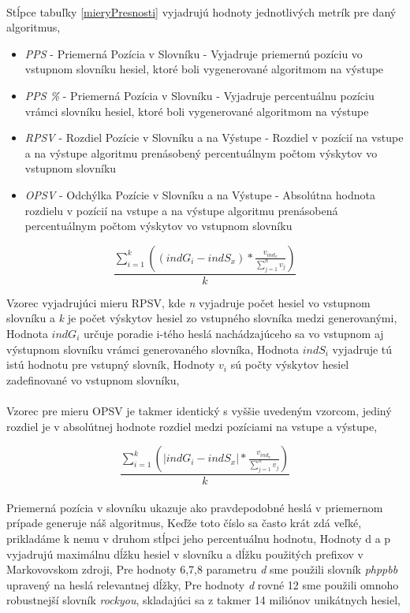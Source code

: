 \paragraph{}
Stĺpce tabuľky \ref{mieryPresnosti} vyjadrujú hodnoty jednotlivých metrík pre daný algoritmus,
\begin{itemize}
	\item \emph{PPS} - Priemerná Pozícia v Slovníku - Vyjadruje priemernú pozíciu vo vstupnom slovníku hesiel, ktoré boli vygenerované algoritmom na výstupe
	\item \emph{PPS \%} - Priemerná Pozícia v Slovníku - Vyjadruje percentuálnu pozíciu vrámci slovníku hesiel, ktoré boli vygenerované algoritmom na výstupe
	\item \emph{RPSV} - Rozdiel Pozície v Slovníku a na Výstupe - Rozdiel v pozícií na vstupe a na výstupe algoritmu prenásobený percentuálnym počtom výskytov vo vstupnom slovníku
    \item \emph{OPSV} - Odchýlka Pozície v Slovníku a na Výstupe - Absolútna hodnota rozdielu v pozícií na vstupe a na výstupe algoritmu prenásobená percentuálnym počtom výskytov vo vstupnom slovníku
\end{itemize}

\[ \frac{\displaystyle\sum_{i=1}^{k}((indG_i - indS_x) * \frac{v_{ind_x}}{\sum_{j=1}^{n}v_j})}{k} \]

Vzorec vyjadrujúci mieru RPSV, kde \emph{n} vyjadruje počet hesiel vo vstupnom slovníku a \emph{k} je počet výskytov hesiel zo vstupného slovníka medzi generovanými, Hodnota \emph{\(indG_i\)} určuje poradie i-tého heslá nachádzajúceho sa vo vstupnom aj výstupnom slovníku vrámci generovaného slovníka, Hodnota \emph{\(indS_i\)} vyjadruje tú istú hodnotu pre vstupný slovník, Hodnoty \emph{\(v_i\)} sú počty výskytov hesiel zadefinované vo vstupnom slovníku,

\paragraph{}
Vzorec pre mieru OPSV je takmer identický s vyššie uvedeným vzorcom, jediný rozdiel je v absolútnej hodnote rozdiel medzi pozíciami na vstupe a výstupe,

\[ \frac{\displaystyle\sum_{i=1}^{k}(|indG_i - indS_x| * \frac{v_{ind_x}}{\sum_{j=1}^{n}v_j})}{k} \]

\paragraph{}
Priemerná pozícia v slovníku ukazuje ako pravdepodobné heslá v priemernom prípade generuje náš algoritmus, Keďže toto číslo sa často krát zdá veľké, prikladáme k nemu v druhom stĺpci jeho percentuálnu hodnotu, Hodnoty d a p vyjadrujú maximálnu dĺžku hesiel v slovníku a dĺžku použitých prefixov v Markovovskom zdroji, Pre hodnoty 6,7,8 parametru \emph{d} sme použili slovník \emph{phppbb} upravený na heslá relevantnej dĺžky, Pre hodnoty \emph{d} rovné 12 sme použili omnoho robustnejší slovník \emph{rockyou}, skladajúci sa z takmer 14 miliónov unikátnych hesiel,


